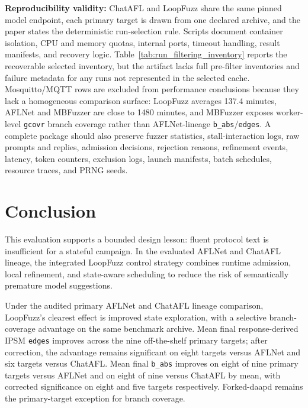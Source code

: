 \documentclass[final,5p,times,number]{elsarticle}
\begin{document}
\textbf{Reproducibility validity:} ChatAFL and LoopFuzz share the same pinned model endpoint, each primary target is drawn from one declared archive, and the paper states the deterministic run-selection rule. Scripts document container isolation, CPU and memory quotas, internal ports, timeout handling, result manifests, and recovery logic. Table~\ref{tab:run_filtering_inventory} reports the recoverable selected inventory, but the artifact lacks full pre-filter inventories and failure metadata for any runs not represented in the selected cache. Mosquitto/MQTT rows are excluded from performance conclusions because they lack a homogeneous comparison surface: LoopFuzz averages 137.4 minutes, AFLNet and MBFuzzer are close to 1480 minutes, and MBFuzzer exposes worker-level \texttt{gcovr} branch coverage rather than AFLNet-lineage \texttt{b\_abs}/\texttt{edges}. A complete package should also preserve fuzzer statistics, stall-interaction logs, raw prompts and replies, admission decisions, rejection reasons, refinement events, latency, token counters, exclusion logs, launch manifests, batch schedules, resource traces, and PRNG seeds.

\section{Conclusion}
This evaluation supports a bounded design lesson: fluent protocol text is insufficient for a stateful campaign. In the evaluated AFLNet and ChatAFL lineage, the integrated LoopFuzz control strategy combines runtime admission, local refinement, and state-aware scheduling to reduce the risk of semantically premature model suggestions.

Under the audited primary AFLNet and ChatAFL lineage comparison, LoopFuzz's clearest effect is improved state exploration, with a selective branch-coverage advantage on the same benchmark archive. Mean final response-derived IPSM \texttt{edges} improves across the nine off-the-shelf primary targets; after correction, the advantage remains significant on eight targets versus AFLNet and six targets versus ChatAFL. Mean final \texttt{b\_abs} improves on eight of nine primary targets versus AFLNet and on eight of nine versus ChatAFL by mean, with corrected significance on eight and five targets respectively. Forked-daapd remains the primary-target exception for branch coverage.
\end{document}
